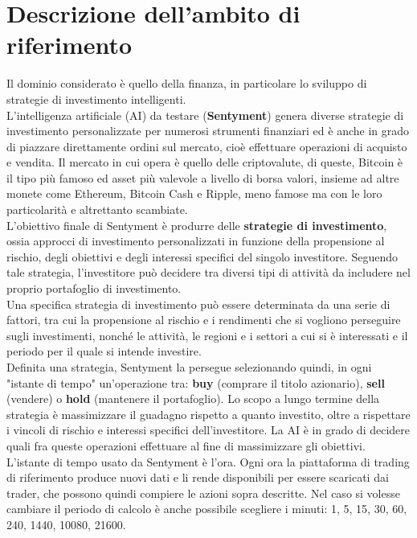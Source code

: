 \documentclass[a4paper,12pt]{report}
\begin{document}
\section{Descrizione dell'ambito di riferimento}
Il dominio considerato è quello della finanza, in particolare lo sviluppo di strategie di investimento intelligenti.\\
L'intelligenza artificiale (AI) da testare (\textbf{Sentyment}) genera diverse strategie di investimento personalizzate per numerosi strumenti finanziari ed è anche in grado di piazzare direttamente ordini sul mercato, cioè effettuare operazioni di acquisto e vendita. Il mercato in cui opera è quello delle criptovalute, di queste, Bitcoin è il tipo più famoso ed asset più valevole a livello di borsa valori, insieme ad altre monete come Ethereum, Bitcoin Cash e Ripple, meno famose ma con le loro particolarità e altrettanto scambiate.\\
L'obiettivo finale di Sentyment è produrre delle \textbf{strategie di investimento}, ossia approcci di investimento personalizzati in funzione della propensione al rischio, degli obiettivi e degli interessi specifici del singolo investitore. Seguendo tale strategia, l’investitore può decidere tra diversi tipi di attività da includere nel proprio portafoglio di investimento.\\
Una specifica strategia di investimento può essere determinata da una serie di fattori, tra cui la propensione al rischio e i rendimenti che si vogliono perseguire sugli investimenti, nonché le attività, le regioni e i settori a cui si è interessati e il periodo per il quale si intende investire.\\
Definita una strategia, Sentyment la persegue selezionando quindi, in ogni "istante di tempo" un'operazione tra: \textbf{buy} (comprare il titolo azionario), \textbf{sell} (vendere) o \textbf{hold} (mantenere il portafoglio). Lo scopo a lungo termine della strategia è massimizzare il guadagno rispetto a quanto investito, oltre a rispettare i vincoli di rischio e interessi specifici dell'investitore. La AI è in grado di decidere quali fra queste operazioni effettuare al fine di massimizzare gli obiettivi.\\
L'istante di tempo usato da Sentyment è l'ora. Ogni ora la piattaforma di trading di riferimento produce nuovi dati e li rende disponibili per essere scaricati dai trader, che possono quindi compiere le azioni sopra descritte. Nel caso si volesse cambiare il periodo di calcolo è anche possibile scegliere i minuti: 1, 5, 15, 30, 60, 240, 1440, 10080, 21600.\\
\end{document}
